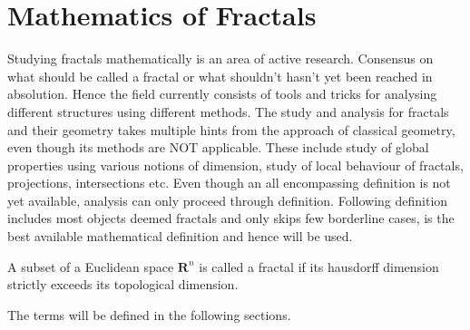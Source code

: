 \section{Mathematics of Fractals}
Studying fractals mathematically is an area of active research. Consensus on
what should be called a fractal or what shouldn't hasn't yet been reached in
absolution. Hence the field currently consists of tools and tricks for analysing
different structures using different methods.
\newline The study and analysis for fractals and their geometry
takes multiple hints from the
approach of classical geometry, even though its methods are NOT applicable.
These include study of global properties using various notions of dimension,
study of local behaviour of fractals, projections, intersections etc.
\newline Even though an all encompassing definition is not yet available,
analysis can only proceed through definition. Following definition includes most
objects deemed fractals and only skips few borderline cases, is the best
available mathematical definition and hence will be used.
\begin{definition}
    A subset of a Euclidean space $\bm{R}^n$ is called a fractal if its
    hausdorff dimension strictly exceeds its topological dimension.
\end{definition}
The terms will be defined in the following sections.

